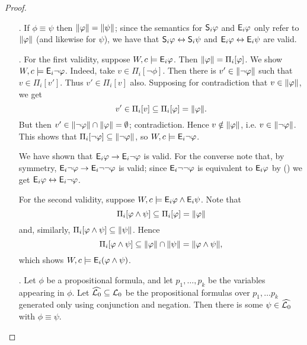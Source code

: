 \begin{proof}\leavevmode
\begin{itemize}
    \item[\labelcref{kr_item_replacement_equivalents_e_s}.]
        If $\phi \equiv \psi$ then $\propmods{\phi} = \propmods{\psi}$; since
        the semantics for $\S_i\phi$ and $\E_i\phi$ only refer to
        $\propmods{\phi}$ (and likewise for $\psi$), we have that $\S_i\phi
        \leftrightarrow \S_i\psi$ and $\E_i\phi \leftrightarrow \E_i\psi$
        are valid.

    \item[\labelcref{kr_item_e_symmetric}.]
        For the first validity, suppose $W, c \models \E_i\phi$. Then
        $\propmods{\phi} = \Pi_i[\phi]$. We show $W, c \models \E_i\neg\phi$.
        Indeed, take $v \in \Pi_i[\neg\phi]$. Then there is $v' \in
        \propmods{\neg\phi}$ such that $v \in \Pi_i[v']$. Thus $v' \in
        \Pi_i[v]$ also. Supposing for contradiction that $v \in
        \propmods{\phi}$, we get
        \[
            v' \in \Pi_i[v] \subseteq \Pi_i[\phi] = \propmods{\phi}.
        \]
        But then $v' \in \propmods{\neg\phi} \cap \propmods{\phi} = \emptyset$;
        contradiction. Hence $v \notin \propmods{\phi}$, i.e. $v \in
        \propmods{\neg\phi}$. This shows that $\Pi_i[\neg\phi] \subseteq
        \propmods{\neg\phi}$, so $W, c \models \E_i\neg\phi$.

        We have shown that $\E_i\phi \rightarrow \E_i\neg\phi$ is valid. For
        the converse note that, by symmetry, $\E_i\neg\phi \rightarrow
        \E_i\neg\neg\phi$ is valid; since $\E_i\neg\neg\phi$ is equivalent to
        $\E_i\phi$ by () we get
        $\E_i\phi \leftrightarrow \E_i\neg\phi$.

        For the second validity, suppose $W, c \models \E_i\phi \land
        \E_i\psi$. Note that
        \[
            \Pi_i[\phi \land \psi]
            \subseteq \Pi_i[\phi]
            = \propmods{\phi}
        \]
        and, similarly, $\Pi_i[\phi \land \psi] \subseteq \propmods{\psi}$.
        Hence
        \[
            \Pi_i[\phi \land \psi]
            \subseteq \propmods{\phi} \cap \propmods{\psi}
            = \propmods{\phi \land \psi},
        \]
        which shows $W, c \models \E_i(\phi \land \psi)$.

    \item[\labelcref{kr_item_exp_on_all_variables}.]
        Let $\phi$ be a propositional formula, and let $p_1, \ldots, p_k$ be
        the variables appearing in $\phi$. Let $\widehat{\lprop} \subseteq
        \lprop$ be the propositional formulas over $p_1, \ldots p_k$ generated
        only using conjunction and negation. Then there is some $\psi \in
        \widehat{\lprop}$ with $\phi \equiv \psi$.


\end{itemize}
\end{proof}
